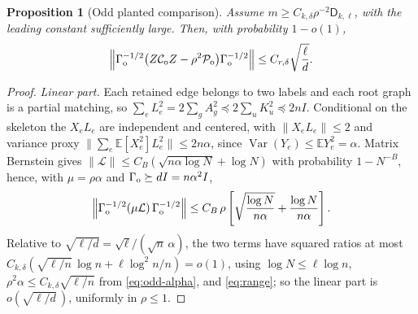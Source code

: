 \documentclass[11pt]{article}
\newtheorem{proposition}[proposition]{Proposition}
\theoremstyle{definition}
\theoremstyle{remark}
\newcommand{\E}{\mathbb E}
\newcommand{\1}{\mathbf 1}
\newcommand{\cC}{\mathcal C}
\newcommand{\cL}{\mathcal L}
\newcommand{\cP}{\mathcal P}
\newcommand{\Dkl}{\mathsf D_{k,\ell}}
\DeclareMathOperator{\Var}{Var}
\numberwithin{equation}{section}
\begin{document}
\begin{proposition}[Odd planted comparison]\label{prop:odd-comparison}
Assume $m\ge C_{k,\delta}\rho^{-2}\Dkl$, with the leading constant
sufficiently large.  Then, with probability $1-o(1)$,
\begin{equation}\label{eq:odd-comparison}
 \left\|\Gamma_{\rm o}^{-1/2}
 \bigl(Z\cC_{\rm o}Z-\rho^2\cP_{\rm o}\bigr)
 \Gamma_{\rm o}^{-1/2}\right\|
 \le C_{r,\delta}\sqrt{\frac\ell d}.
\end{equation}
\end{proposition}
\begin{proof}
\emph{Linear part.}  Each retained edge belongs to two labels and each
root graph is a partial matching, so
$\sum_eL_e^2=2\sum_gA_g^2\preceq2\sum_uK_u^2\preceq2nI$.  Conditional
on the skeleton the $X_eL_e$ are independent and centered, with
$\|X_eL_e\|\le2$ and variance proxy
$\|\sum_e\E[X_e^2]L_e^2\|\le2n\alpha$, since
$\Var(Y_e)\le\E Y_e^2=\alpha$.  Matrix Bernstein gives
$\|\cL\|\le C_B(\sqrt{n\alpha\log N}+\log N)$ with probability
$1-N^{-B}$, hence, with $\mu=\rho\alpha$ and
$\Gamma_{\rm o}\succeq dI=n\alpha^2I$,
\[
 \left\|\Gamma_{\rm o}^{-1/2}(\mu\cL)\,\Gamma_{\rm o}^{-1/2}\right\|
 \le C_B\,\rho\left[\sqrt{\frac{\log N}{n\alpha}}
 +\frac{\log N}{n\alpha}\right].
\]
Relative to $\sqrt{\ell/d}=\sqrt\ell/(\sqrt n\,\alpha)$, the two terms
have squared ratios at most
$C_{k,\delta}(\sqrt{\ell/n}\,\log n+\ell\log^2n/n)=o(1)$, using
$\log N\le\ell\log n$, $\rho^2\alpha\le C_{k,\delta}\sqrt{\ell/n}$ from
\cref{eq:odd-alpha}, and \cref{eq:range}; so the linear part is
$o(\sqrt{\ell/d}\,)$, uniformly in $\rho\le1$.


\end{proof}
\end{document}
